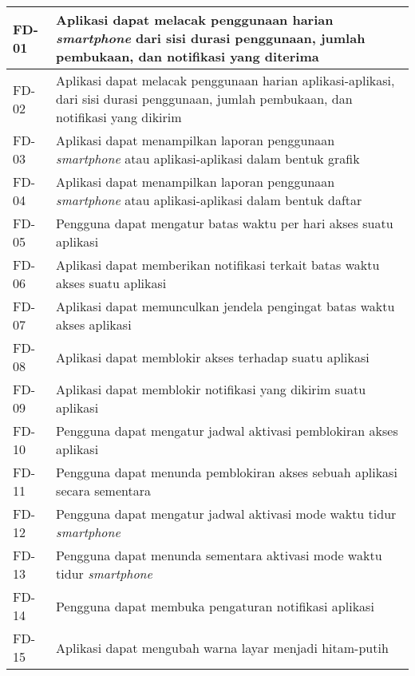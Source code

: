 \begin{footnotesize}
\begin{longtable}[c]{|W{c}{0.08\textwidth}|>{\ccnormspacing}m{0.82\textwidth}|}
  FD-01  &  Aplikasi dapat melacak penggunaan harian \textit{smartphone} dari sisi durasi penggunaan, jumlah pembukaan, dan notifikasi yang diterima \\ \hline
  FD-02  &  Aplikasi dapat melacak penggunaan harian aplikasi-aplikasi, dari sisi durasi penggunaan, jumlah pembukaan, dan notifikasi yang dikirim \\ \hline
  FD-03  &  Aplikasi dapat menampilkan laporan penggunaan \textit{smartphone} atau aplikasi-aplikasi dalam bentuk grafik \\ \hline
  FD-04  &  Aplikasi dapat menampilkan laporan penggunaan \textit{smartphone} atau aplikasi-aplikasi dalam bentuk daftar \\ \hline
  FD-05  &  Pengguna dapat mengatur batas waktu per hari akses suatu aplikasi \\ \hline
  FD-06  &  Aplikasi dapat memberikan notifikasi terkait batas waktu akses suatu aplikasi \\ \hline
  FD-07  &  Aplikasi dapat memunculkan jendela pengingat batas waktu akses aplikasi \\ \hline
  FD-08  &  Aplikasi dapat memblokir akses terhadap suatu aplikasi \\ \hline
  FD-09  &  Aplikasi dapat memblokir notifikasi yang dikirim suatu aplikasi \\ \hline
  FD-10  &  Pengguna dapat mengatur jadwal aktivasi pemblokiran akses aplikasi \\ \hline
  FD-11  &  Pengguna dapat menunda pemblokiran akses sebuah aplikasi secara sementara \\ \hline
  FD-12  &  Pengguna dapat mengatur jadwal aktivasi mode waktu tidur \textit{smartphone} \\ \hline
  FD-13  &  Pengguna dapat menunda sementara aktivasi mode waktu tidur \textit{smartphone} \\ \hline
  FD-14  &  Pengguna dapat membuka pengaturan notifikasi aplikasi \\ \hline
  FD-15  &  Aplikasi dapat mengubah warna layar menjadi hitam-putih \\ \hline
\end{longtable}
\end{footnotesize}
\justifying
\FloatBarrier

